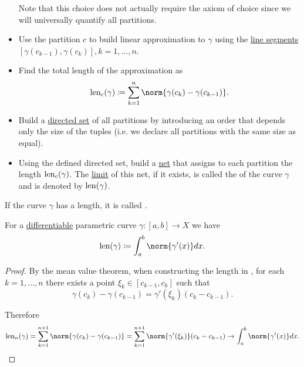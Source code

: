 \begin{definition}
\begin{itemize}
          Note that this choice does not actually require the axiom of choice since we will universally quantify all partitions.

    \item Use the partition \( c \) to build linear approximation to \( \gamma \) using the \hyperref[def:convex_set/line_segment]{line segments} \( [\gamma(c_{k-1}), \gamma(c_k)], k = 1, \ldots, n \).

    \item Find the total length of the approximation as
          \begin{equation*}
            \len_c (\gamma) \coloneqq \sum_{k=1}^n \norm{\gamma(c_k) - \gamma(c_{k-1})}.
          \end{equation*}

    \item Build a \hyperref[def:directed_set]{directed set} of all partitions by introducing an order that depends only the size of the tuples (i.e. we declare all partitions with the same size as equal).

    \item Using the defined directed set, build a \hyperref[def:topological_net]{net} that assigns to each partition the length \( \operatorname{len}_c(\gamma) \). The \hyperref[def:net_convergence/limit]{limit} of this net, if it exists, is called the  of the curve \( \gamma \) and is denoted by \( \operatorname{len}(\gamma) \).
  \end{itemize}

  If the curve \( \gamma \) has a length, it is called .
\end{definition}

\begin{proposition}\label{thm:length_of_smooth_curves}
  For a \hyperref[def:differentiability/frechet]{differentiable} parametric curve \( \gamma: [a, b] \to X \) we have
  \begin{equation*}
    \len(\gamma) \coloneqq \int_a^b \norm{\gamma'(x)} dx.
  \end{equation*}
\end{proposition}
\begin{proof}
  By the mean value theorem, when constructing the length in , for each \( k = 1, \ldots, n \) there exists a point \( \xi_k \in [c_{k-1}, c_k] \) such that
  \begin{equation*}
    \gamma(c_k) - \gamma(c_{k-1}) = \gamma'(\xi_k) (c_k - c_{k-1}).
  \end{equation*}

  Therefore
  \begin{equation*}
    \len_n (\gamma)
    =
    \sum_{k=1}^{n+1} \norm{\gamma(c_k) - \gamma(c_{k-1})}
    =
    \sum_{k=1}^{n+1} \norm{\gamma'(\xi_k)} (c_k - c_{k-1})
    \to
    \int_a^b \norm{\gamma'(x)} dx.
  \end{equation*}
\end{proof}

